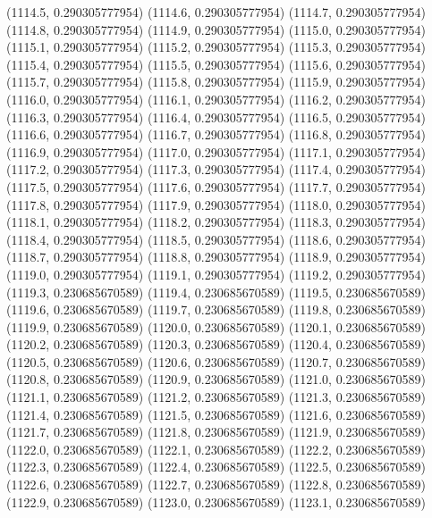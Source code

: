 {					(1114.5, 0.290305777954)
					(1114.6, 0.290305777954)
					(1114.7, 0.290305777954)
					(1114.8, 0.290305777954)
					(1114.9, 0.290305777954)
					(1115.0, 0.290305777954)
					(1115.1, 0.290305777954)
					(1115.2, 0.290305777954)
					(1115.3, 0.290305777954)
					(1115.4, 0.290305777954)
					(1115.5, 0.290305777954)
					(1115.6, 0.290305777954)
					(1115.7, 0.290305777954)
					(1115.8, 0.290305777954)
					(1115.9, 0.290305777954)
					(1116.0, 0.290305777954)
					(1116.1, 0.290305777954)
					(1116.2, 0.290305777954)
					(1116.3, 0.290305777954)
					(1116.4, 0.290305777954)
					(1116.5, 0.290305777954)
					(1116.6, 0.290305777954)
					(1116.7, 0.290305777954)
					(1116.8, 0.290305777954)
					(1116.9, 0.290305777954)
					(1117.0, 0.290305777954)
					(1117.1, 0.290305777954)
					(1117.2, 0.290305777954)
					(1117.3, 0.290305777954)
					(1117.4, 0.290305777954)
					(1117.5, 0.290305777954)
					(1117.6, 0.290305777954)
					(1117.7, 0.290305777954)
					(1117.8, 0.290305777954)
					(1117.9, 0.290305777954)
					(1118.0, 0.290305777954)
					(1118.1, 0.290305777954)
					(1118.2, 0.290305777954)
					(1118.3, 0.290305777954)
					(1118.4, 0.290305777954)
					(1118.5, 0.290305777954)
					(1118.6, 0.290305777954)
					(1118.7, 0.290305777954)
					(1118.8, 0.290305777954)
					(1118.9, 0.290305777954)
					(1119.0, 0.290305777954)
					(1119.1, 0.290305777954)
					(1119.2, 0.290305777954)
					(1119.3, 0.230685670589)
					(1119.4, 0.230685670589)
					(1119.5, 0.230685670589)
					(1119.6, 0.230685670589)
					(1119.7, 0.230685670589)
					(1119.8, 0.230685670589)
					(1119.9, 0.230685670589)
					(1120.0, 0.230685670589)
					(1120.1, 0.230685670589)
					(1120.2, 0.230685670589)
					(1120.3, 0.230685670589)
					(1120.4, 0.230685670589)
					(1120.5, 0.230685670589)
					(1120.6, 0.230685670589)
					(1120.7, 0.230685670589)
					(1120.8, 0.230685670589)
					(1120.9, 0.230685670589)
					(1121.0, 0.230685670589)
					(1121.1, 0.230685670589)
					(1121.2, 0.230685670589)
					(1121.3, 0.230685670589)
					(1121.4, 0.230685670589)
					(1121.5, 0.230685670589)
					(1121.6, 0.230685670589)
					(1121.7, 0.230685670589)
					(1121.8, 0.230685670589)
					(1121.9, 0.230685670589)
					(1122.0, 0.230685670589)
					(1122.1, 0.230685670589)
					(1122.2, 0.230685670589)
					(1122.3, 0.230685670589)
					(1122.4, 0.230685670589)
					(1122.5, 0.230685670589)
					(1122.6, 0.230685670589)
					(1122.7, 0.230685670589)
					(1122.8, 0.230685670589)
					(1122.9, 0.230685670589)
					(1123.0, 0.230685670589)
					(1123.1, 0.230685670589)
}
